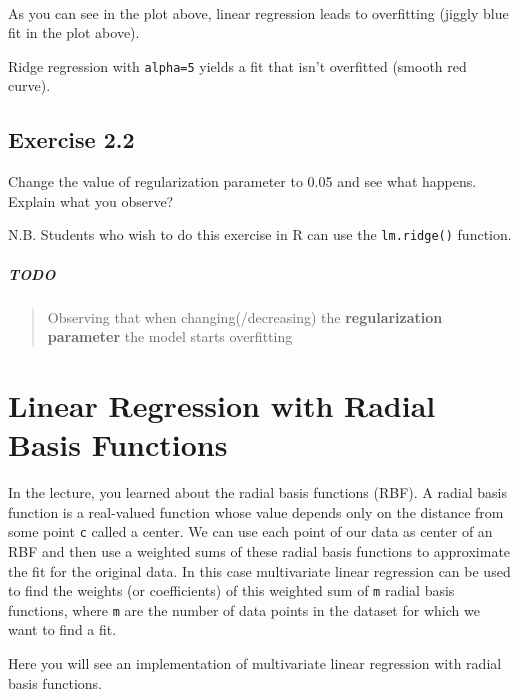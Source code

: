 \documentclass[11pt]{article}
\begin{document}
    \begin{center}
    \end{center}
    { \hspace*{\fill} \\}
    
    As you can see in the plot above, linear regression leads to overfitting
(jiggly blue fit in the plot above).

Ridge regression with \texttt{alpha=5} yields a fit that isn't
overfitted (smooth red curve).

    \hypertarget{exercise-2.2}{%
\subsection{Exercise 2.2}\label{exercise-2.2}}

Change the value of regularization parameter to 0.05 and see what
happens. Explain what you observe?

N.B. Students who wish to do this exercise in R can use the
\texttt{lm.ridge()} function.

    \hypertarget{todo}{%
\subparagraph{TODO}\label{todo}}

\begin{quote}
Observing that when changing(/decreasing) the \textbf{regularization
parameter} the model starts overfitting
\end{quote}

    \hypertarget{linear-regression-with-radial-basis-functions}{%
\section{Linear Regression with Radial Basis
Functions}\label{linear-regression-with-radial-basis-functions}}

In the lecture, you learned about the radial basis functions (RBF). A
radial basis function is a real-valued function whose value depends only
on the distance from some point \texttt{c} called a center. We can use
each point of our data as center of an RBF and then use a weighted sums
of these radial basis functions to approximate the fit for the original
data. In this case multivariate linear regression can be used to find
the weights (or coefficients) of this weighted sum of \texttt{m} radial
basis functions, where \texttt{m} are the number of data points in the
dataset for which we want to find a fit.

Here you will see an implementation of multivariate linear regression
with radial basis functions.
\end{document}
